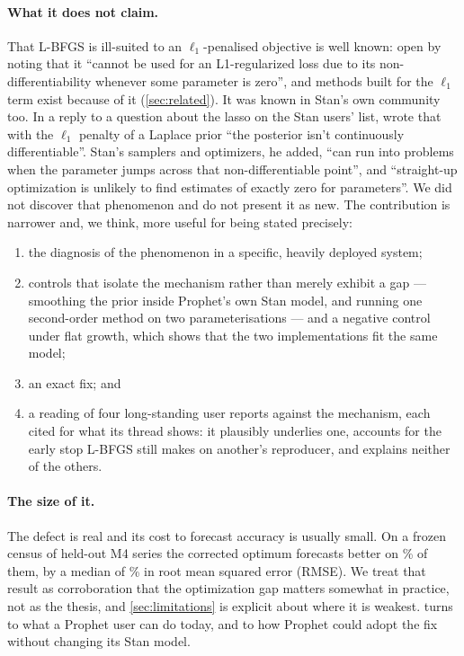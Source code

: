 \paragraph{What it does not claim.}
That L-BFGS is ill-suited to an $\ell_1$-penalised objective is well known:
\citet{andrew2007scalable} open by noting that it ``cannot be used for an
L1-regularized loss due to its non-differentiability whenever some parameter is
zero'', and methods built for the $\ell_1$ term exist because of it
(\cref{sec:related}). It was known in Stan's own community too. In a reply to a
question about the lasso on the Stan users' list, \citet{carpenter2017lasso} wrote
that with the $\ell_1$ penalty of a Laplace prior ``the posterior isn't continuously
differentiable''. Stan's samplers and optimizers, he added, ``can run into problems
when the parameter jumps across that non-differentiable point'', and ``straight-up
optimization is unlikely to find estimates of exactly zero for parameters''. We did
not discover that phenomenon and do not present it as new. The contribution is
narrower and, we
think, more useful for being stated precisely:
\begin{enumerate}
  \item the diagnosis of the phenomenon in a specific, heavily deployed system;
  \item controls that isolate the mechanism rather than merely exhibit a gap ---
        smoothing the prior inside Prophet's own Stan model, and running one
        second-order method on two parameterisations --- and a negative control
        under flat growth, which shows that the two implementations fit the same
        model;
  \item an exact fix; and
  \item a reading of four long-standing user reports against the mechanism, each
        cited for what its thread shows: it plausibly underlies one, accounts for the
        early stop L-BFGS still makes on another's reproducer, and explains neither of
        the others.
\end{enumerate}

\paragraph{The size of it.}
The defect is real and its cost to forecast accuracy is usually small. On a
frozen census of \CensusSeries{} held-out M4 series \citep{makridakis2020m4} the
corrected optimum forecasts better on \RmseWinRate\% of them, by a median of
\RmseAdvantage\% in root mean squared error (RMSE). We treat that result as
corroboration that the optimization gap matters somewhat in practice, not as the
thesis, and \cref{sec:limitations} is explicit about where it is weakest.
 turns to what a Prophet user can do today, and to how Prophet
could adopt the fix without changing its Stan model.
